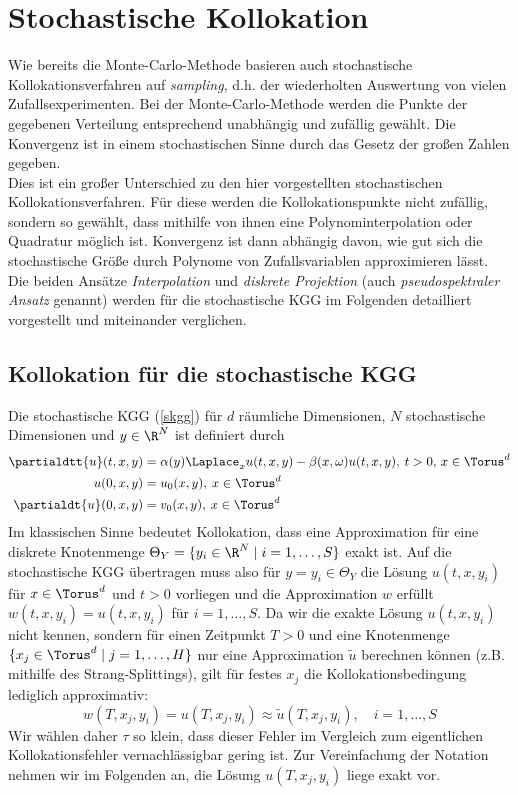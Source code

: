 
\chapter{Stochastische Kollokation}
\label{Chapter4}
Wie bereits die Monte-Carlo-Methode basieren auch stochastische Kollokationsverfahren auf \emph{sampling}, d.h. der wiederholten Auswertung von vielen Zufallsexperimenten. Bei der Monte-Carlo-Methode werden die Punkte der gegebenen Verteilung entsprechend unabhängig und zufällig gewählt. Die Konvergenz ist in einem stochastischen Sinne durch das Gesetz der großen Zahlen gegeben.\\
Dies ist ein großer Unterschied zu den hier vorgestellten stochastischen Kollokationsverfahren. Für diese werden die Kollokationspunkte nicht zufällig, sondern so gewählt, dass mithilfe von ihnen eine Polynominterpolation oder Quadratur möglich ist. Konvergenz ist dann abhängig davon, wie gut sich die stochastische Größe durch Polynome von Zufallsvariablen approximieren lässt.\\
Die beiden Ansätze \emph{Interpolation} und \emph{diskrete Projektion} (auch \emph{pseudospektraler Ansatz} genannt) werden für die stochastische KGG im Folgenden detailliert vorgestellt und miteinander verglichen.
\section*{Kollokation für die stochastische KGG}
Die stochastische KGG (\ref{skgg}) für $d$ räumliche Dimensionen, $N$ stochastische Dimensionen und $y\in\R^N$ ist definiert durch
\begin{align*}
\partialdtt{u}(t,x,y)&=\alpha(y) \Laplace_x u(t,x,y) - \beta(x,\omega)u(t,x,y), \: t>0, \, x\in \Torus^d\\
u(0,x,y)&=u_0(x,y), \: x\in \Torus^d\\
\partialdt{u}(0,x,y)&=v_0(x,y), \: x\in \Torus^d
\end{align*}
Im klassischen Sinne bedeutet Kollokation, dass eine Approximation für eine diskrete Knotenmenge $\Theta_Y=\lbrace y_i\in\R^N\mid i=1,\dots,S\rbrace$ exakt ist. Auf die stochastische KGG übertragen muss also für $y=y_i\in\Theta_Y$ die Lösung $u(t,x,y_i)$ für $x\in\Torus^d$ und $t>0$ vorliegen und die Approximation $w$ erfüllt $w(t,x,y_i)=u(t,x,y_i)$ für $i=1,\dots,S$. Da wir die exakte Lösung $u(t,x,y_i)$ nicht kennen, sondern für einen Zeitpunkt $T>0$ und eine Knotenmenge $\lbrace x_j\in\Torus^d\mid j=1,\dots,H\rbrace$ nur eine Approximation $\tilde{u}$ berechnen können (z.B. mithilfe des Strang-Splittings), gilt für festes $x_j$ die Kollokationsbedingung lediglich approximativ:
\[w(T,x_j,y_i)=u(T,x_j,y_i)\approx \tilde{u}(T,x_j,y_i),\quad i=1,\dots,S\]
Wir wählen daher $\tau$ so klein, dass dieser Fehler im Vergleich zum eigentlichen Kollokationsfehler vernachlässigbar gering ist. Zur Vereinfachung der Notation nehmen wir im Folgenden an, die Lösung $u(T,x_j,y_i)$ liege exakt vor.


